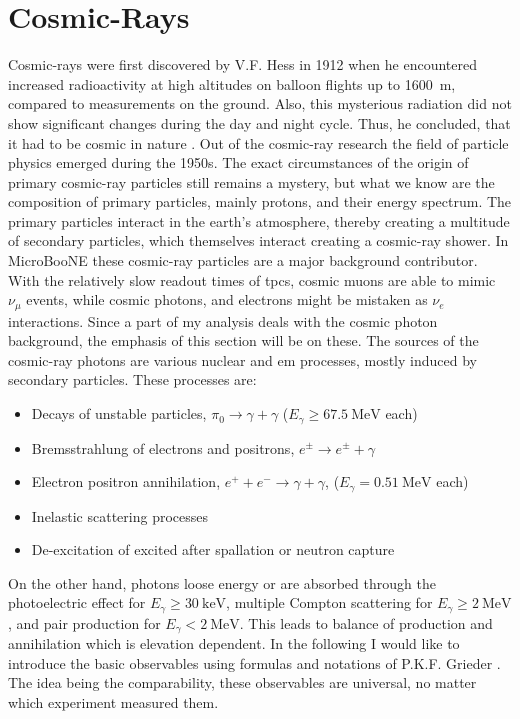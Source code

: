 \section{Cosmic-Rays} \label{sec:CosmicRayTheory}
Cosmic-rays were first discovered by V.F. Hess in 1912 when he encountered increased radioactivity at high altitudes on balloon flights up to \SI{1600}{\metre}, compared to measurements on the ground. Also, this mysterious radiation did not show significant changes during the day and night cycle. Thus, he concluded, that it had to be cosmic in nature \cite{CosmicRayDiscovery}. Out of the cosmic-ray research the field of particle physics emerged during the 1950s. The exact circumstances of the origin of primary cosmic-ray particles still remains a mystery, but what we know are the composition of primary particles, mainly protons, and their energy spectrum. The primary particles interact in the earth's atmosphere, thereby creating a multitude of secondary particles, which themselves interact creating a cosmic-ray shower. In MicroBooNE these cosmic-ray particles are a major background contributor. With the relatively slow readout times of \glspl{tpc}, cosmic muons are able to mimic $\nu_\mu$ events, while cosmic photons, and electrons might be mistaken as $\nu_e$ interactions. Since a part of my analysis deals with the cosmic photon background, the emphasis of this section will be on these. The sources of the cosmic-ray photons are various nuclear and \gls{em} processes, mostly induced by secondary particles. These processes are:
\begin{itemize}
    \item Decays of unstable particles, \eg $\pi_0 \to \gamma + \gamma$ ($E_\gamma \geq \SI{67.5}{\mega\electronvolt}$ each)
    \item Bremsstrahlung of electrons and positrons, \ie $e^\pm \to e^\pm + \gamma$
    \item Electron positron annihilation, \ie $e^+ + e^- \to \gamma + \gamma$, ($E_\gamma = \SI{0.51}{\mega\electronvolt}$ each)
    \item Inelastic scattering processes
    \item De-excitation of excited after spallation or neutron capture
\end{itemize}
On the other hand, photons loose energy or are absorbed through the photoelectric effect for $E_\gamma \geq \SI{30}{\kilo\electronvolt}$, multiple Compton scattering for $E_\gamma \geq \SI{2}{\mega\electronvolt}$, and pair production for $E_\gamma < \SI{2}{\mega\electronvolt}$. This leads to balance of production and annihilation which is elevation dependent. In the following I would like to introduce the basic observables using formulas and notations of P.K.F. Grieder \cite{CosmicRayGrieder}. The idea being the comparability, these observables are universal, no matter which experiment measured them.  

